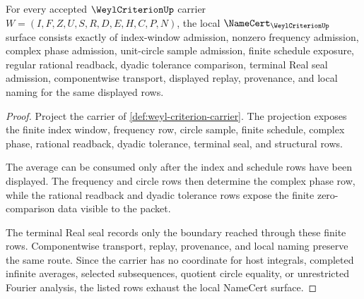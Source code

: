 \begin{theorem}
\label{thm:weyl-criterion-namecert-obligations}
For every accepted $\WeylCriterionUp$ carrier $W=(I,F,Z,U,S,R,D,E,H,C,P,N)$, the local $\NameCert_{\WeylCriterionUp}$ surface consists exactly of index-window admission, nonzero frequency admission, complex phase admission, unit-circle sample admission, finite schedule exposure, regular rational readback, dyadic tolerance comparison, terminal Real seal admission, componentwise transport, displayed replay, provenance, and local naming for the same displayed rows.
\end{theorem}
\begin{proof}
Project the carrier of \autoref{def:weyl-criterion-carrier}. The projection exposes the finite index window, frequency row, circle sample, finite schedule, complex phase, rational readback, dyadic tolerance, terminal seal, and structural rows.

The average can be consumed only after the index and schedule rows have been displayed. The frequency and circle rows then determine the complex phase row, while the rational readback and dyadic tolerance rows expose the finite zero-comparison data visible to the packet.

The terminal Real seal records only the boundary reached through these finite rows. Componentwise transport, replay, provenance, and local naming preserve the same route. Since the carrier has no coordinate for host integrals, completed infinite averages, selected subsequences, quotient circle equality, or unrestricted Fourier analysis, the listed rows exhaust the local NameCert surface.
\end{proof}

